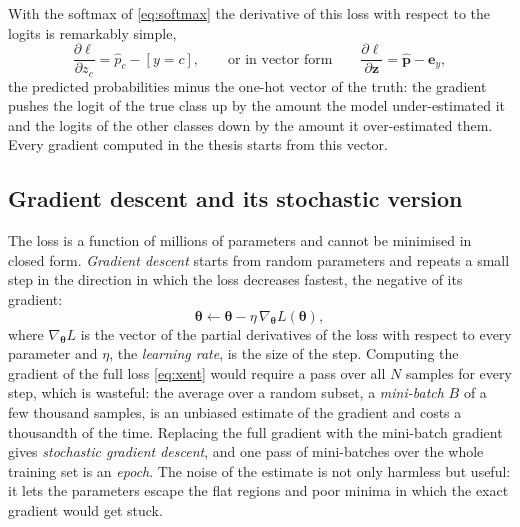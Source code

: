 With the softmax of \cref{eq:softmax} the derivative of this loss with respect to the
logits is remarkably simple,
\begin{equation}
  \frac{\partial \ell}{\partial z_c} = \hat{p}_c - [y = c],
  \qquad \text{or in vector form} \qquad
  \frac{\partial \ell}{\partial \mathbf{z}} = \hat{\mathbf{p}} - \mathbf{e}_{y},
  \label{eq:xent-grad}
\end{equation}
the predicted probabilities minus the one-hot vector of the truth: the gradient pushes
the logit of the true class up by the amount the model under-estimated it and the logits of
the other classes down by the amount it over-estimated them.  Every gradient computed in
the thesis starts from this vector.

\subsection{Gradient descent and its stochastic version}
\label{sec:bg:learning:sgd}

The loss is a function of millions of parameters and cannot be minimised in closed form.
\emph{Gradient descent} starts from random parameters and repeats a small step in the
direction in which the loss decreases fastest, the negative of its gradient:
\begin{equation}
  \boldsymbol{\theta} \leftarrow \boldsymbol{\theta} - \eta\, \nabla_{\boldsymbol{\theta}} L(\boldsymbol{\theta}),
  \label{eq:gd}
\end{equation}
where $\nabla_{\boldsymbol{\theta}} L$ is the vector of the partial derivatives of the loss
with respect to every parameter and $\eta$, the \emph{learning rate}, is the size of the
step.  Computing the gradient of the full loss \cref{eq:xent} would require a pass over
all $N$ samples for every step, which is wasteful: the average over a random subset, a
\emph{mini-batch} $B$ of a few thousand samples, is an unbiased estimate of the gradient
and costs a thousandth of the time.  Replacing the full gradient with the mini-batch
gradient gives \emph{stochastic gradient descent}, and one pass of mini-batches over the
whole training set is an \emph{epoch}.  The noise of the estimate is not only harmless but
useful: it lets the parameters escape the flat regions and poor minima in which the exact
gradient would get stuck.

